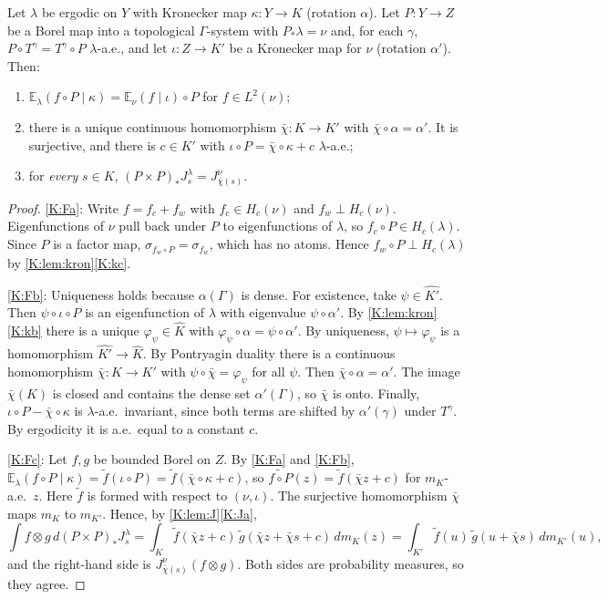 \begin{lemma}\label{K:lem:factor}
Let $\lambda$ be ergodic on $Y$ with Kronecker map $\kappa\colon Y\to K$ (rotation $\alpha$).
Let $P\colon Y\to Z$ be a Borel map into a topological $\Gamma$-system with
$P_*\lambda=\nu$ and, for each $\gamma$, $P\circ T^\gamma=T^\gamma\circ P$ $\lambda$-a.e., and let $\iota\colon Z\to K'$ be a Kronecker map for $\nu$ (rotation $\alpha'$).
Then:
\begin{enumerate}[label=(\alph*)]
\item\label{K:Fa} $\mathbb E_\lambda(f\circ P\mid\kappa)=\mathbb E_\nu(f\mid\iota)\circ P$ for $f\in L^2(\nu)$;
\item\label{K:Fb} there is a unique continuous homomorphism $\bar\chi\colon K\to K'$ with
$\bar\chi\circ\alpha=\alpha'$. It is surjective, and there is $c\in K'$ with
$\iota\circ P=\bar\chi\circ\kappa+c$ $\lambda$-a.e.;
\item\label{K:Fc} for \emph{every} $s\in K$, $(P\times P)_*J^\lambda_s=J^\nu_{\bar\chi(s)}$.
\end{enumerate}
\end{lemma}

\begin{proof}
\ref{K:Fa}: Write $f=f_c+f_w$ with $f_c\in H_c(\nu)$ and $f_w\perp H_c(\nu)$.
Eigenfunctions of $\nu$ pull back under $P$ to eigenfunctions of $\lambda$, so
$f_c\circ P\in H_c(\lambda)$.
Since $P$ is a factor map, $\sigma_{f_w\circ P}=\sigma_{f_w}$, which has no atoms. Hence
$f_w\circ P\perp H_c(\lambda)$ by \cref{K:lem:kron}\ref{K:kc}.

\ref{K:Fb}: Uniqueness holds because $\alpha(\Gamma)$ is dense.
For existence, take $\psi\in\widehat{K'}$. Then $\psi\circ\iota\circ P$ is an eigenfunction of
$\lambda$ with eigenvalue $\psi\circ\alpha'$.
By \cref{K:lem:kron}\ref{K:kb} there is a unique $\varphi_\psi\in\widehat K$ with
$\varphi_\psi\circ\alpha=\psi\circ\alpha'$. By uniqueness, $\psi\mapsto\varphi_\psi$ is a
homomorphism $\widehat{K'}\to\widehat K$.
By Pontryagin duality there is a continuous homomorphism $\bar\chi\colon K\to K'$ with
$\psi\circ\bar\chi=\varphi_\psi$ for all $\psi$. Then $\bar\chi\circ\alpha=\alpha'$.
The image $\bar\chi(K)$ is closed and contains the dense set $\alpha'(\Gamma)$, so $\bar\chi$
is onto.
Finally, $\iota\circ P-\bar\chi\circ\kappa$ is $\lambda$-a.e.\ invariant, since both terms
are shifted by $\alpha'(\gamma)$ under $T^\gamma$. By ergodicity it is a.e.\ equal to a
constant $c$.

\ref{K:Fc}: Let $f,g$ be bounded Borel on $Z$.
By \ref{K:Fa} and \ref{K:Fb},
$\mathbb E_\lambda(f\circ P\mid\kappa)=\tilde f(\iota\circ P)=\tilde f(\bar\chi\circ\kappa+c)$,
so $\widetilde{f\circ P}(z)=\tilde f(\bar\chi z+c)$ for $m_K$-a.e.\ $z$. Here
$\tilde f$ is formed with respect to $(\nu,\iota)$.
The surjective homomorphism $\bar\chi$ maps $m_K$ to $m_{K'}$. Hence, by \cref{K:lem:J}\ref{K:Ja},
\[
\int f\otimes g\,d(P\times P)_*J^\lambda_s=\int_K\tilde f(\bar\chi z+c)\,\tilde g(\bar\chi z+\bar\chi s+c)\,dm_K(z)
=\int_{K'}\tilde f(u)\,\tilde g(u+\bar\chi s)\,dm_{K'}(u),
\]
and the right-hand side is $J^\nu_{\bar\chi(s)}(f\otimes g)$.
Both sides are probability measures, so they agree.
\end{proof}

